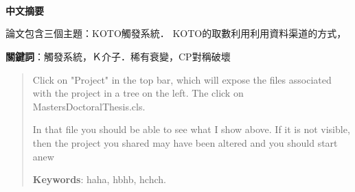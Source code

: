\documentclass[
11pt, %
english, %
singlespacing, %
nolistspacing, %
liststotoc, %
toctotoc, %
parskip, %
headsepline, %
consistentlayout, %
]{MastersDoctoralThesis} %
\begin{document}
\cleardoublepage


\begin{CJK}{UTF8}{bkai}
 ~ \\
 ~ \\
 ~ \\
\huge \textbf{中文摘要}
\end{CJK}

\vspace{1.5cm}

\begin{CJK}{UTF8}{bkai}
論文包含三個主題：KOTO觸發系統．
KOTO的取數利用利用資料渠道的方式，
\end{CJK}

\vspace{0.5cm}


\vspace{0.5cm}

\begin{CJK}{UTF8}{bkai}
\textbf{關鍵詞}：觸發系統，Ｋ介子．稀有衰變，CP對稱破壞
\end{CJK}

\linespread{0}

\begin{CJK}{UTF8}{bkai}
\clearpage
\end{CJK}


\begin{abstract}
\addchaptertocentry{\abstractname} %
Click on "Project" in the top bar, which will expose the files associated with the project in a tree on the left. The click on MastersDoctoralThesis.cls. 
\par
In that file you should be able to see what I show above. If it is not visible, then the project you shared may have been altered and you should start anew
\par
\vspace{0.5cm}
\textbf{Keywords}: haha, hbhb, hchch.
\end{abstract}
\end{document}

